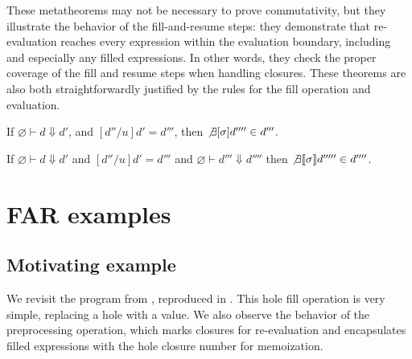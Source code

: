 These metatheorems may not be necessary to prove commutativity, but they illustrate the behavior of the fill-and-resume steps: they demonstrate that re-evaluation reaches every expression within the evaluation boundary, including and especially any filled expressions. In other words, they check the proper coverage of the fill and resume steps when handling closures. These theorems are also both straightforwardly justified by the rules for the fill operation and evaluation.

\begin{theorem}
  If $\varnothing\vdash d\Downarrow d'$, and $[d''/u]d'=d'''$, then $\not\exists[\sigma]d''''\in d'''$.
  \label{thm:fill-reeval}
\end{theorem}

\begin{theorem}
  If $\varnothing\vdash d\Downarrow d'$ and $[d''/u]d'=d'''$ and $\varnothing\vdash d'''\Downarrow d''''$ then $\not\exists\llbracket\sigma\rrbracket d'''''\in d''''$.
  \label{thm:resume-reeval}
\end{theorem}

\section{FAR examples}
\label{sec:far-examples}

\subsection{Motivating example}
\label{sec:far-motivating-example}

We revisit the program from , reproduced in . This hole fill operation is very simple, replacing a hole with a value. We also observe the behavior of the preprocessing operation, which marks closures for re-evaluation and encapsulates filled expressions with the hole closure number for memoization.

